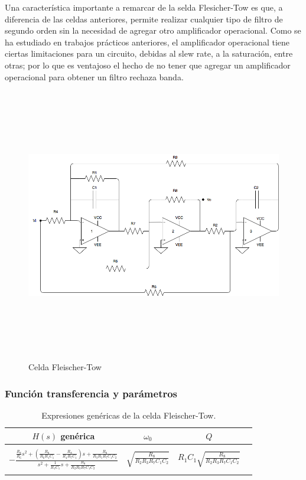 Una caracter\'istica importante a remarcar de la selda Flesicher-Tow es que, a diferencia de las celdas anteriores, permite realizar cualquier tipo de filtro de segundo orden sin la necesidad de agregar otro amplificador operacional. Como se ha estudiado en trabajos pr\'acticos anteriores, el amplificador operacional tiene ciertas limitaciones para un circuito, debidas al slew rate, a la saturaci\'on, entre otras; por lo que es ventajoso el hecho de no tener que agregar un amplificador operacional para obtener un filtro rechaza banda.


\begin{figure}[H] %
	\centering
	\includegraphics[width=12cm,height=12cm,keepaspectratio]{../EJ4/imagenes/FLEISCHER.png}
	\caption{Celda Fleischer-Tow}
	\label{fleischer}
\end{figure}

\subsubsection{Funci\'on transferencia y par\'ametros}

\begin{table}[H] %
	\centering
	\begin{tabular}{c c c c}
		$H(s)$ gen\'erica & $\omega_0$ & $Q$\\
		\hline \\
		 $- \frac{\frac{R_8}{R_6}s^2+\left(\frac{R_8}{R_6R_1C_1}-\frac{R_8}{R_4R_7C_1}\right)s+\frac{R_8}{R_3R_5R_7C_1C_2}}{s^2+\frac{1}{R_1C_1}s+\frac{R_8}{R_2R_3R_7C_1C_2}}$&$\sqrt{\frac{R_8}{R_2R_3R_7C_1C_2}}$&$R_1C_1\sqrt{\frac{R_8}{R_2R_3R_7C_1C_2}}$\\ \\
		\hline
	\end{tabular}
	\caption{Expresiones gen\'ericas de la celda Fleischer-Tow.}
	\label{f_generica}
\end{table}

